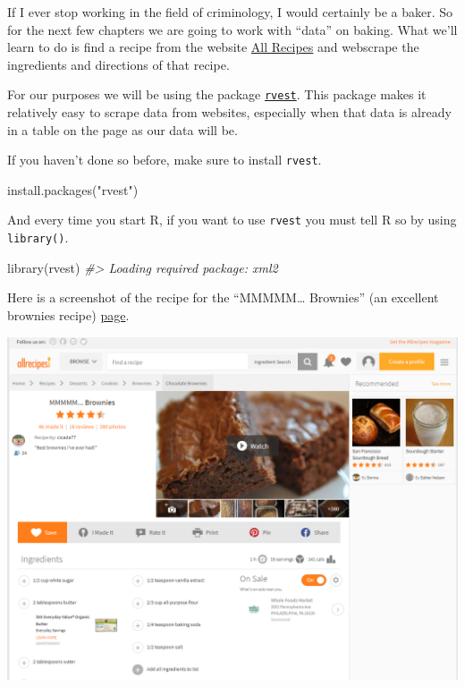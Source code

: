 \documentclass[
  12pt,
]{book}
\newenvironment{Shaded}{\begin{snugshade}}{\end{snugshade}}
\newcommand{\CommentTok}[1]{\textcolor[rgb]{0.37,0.37,0.37}{\textit{#1}}}
\newcommand{\FunctionTok}[1]{\textcolor[rgb]{0,0,0}{#1}}
\newcommand{\NormalTok}[1]{#1}
\newcommand{\StringTok}[1]{\textcolor[rgb]{0.5,0.5,0.5}{#1}}
\begin{document}
If I ever stop working in the field of criminology, I would certainly be a baker. So for the next few chapters we are going to work with ``data'' on baking. What we'll learn to do is find a recipe from the website \href{https://www.allrecipes.com/}{All Recipes} and webscrape the ingredients and directions of that recipe.

For our purposes we will be using the package \href{https://github.com/tidyverse/rvest}{\texttt{rvest}}. This package makes it relatively easy to scrape data from websites, especially when that data is already in a table on the page as our data will be.

If you haven't done so before, make sure to install \texttt{rvest}.

\begin{Shaded}
\begin{Highlighting}[]
\FunctionTok{install.packages}\NormalTok{(}\StringTok{"rvest"}\NormalTok{)}
\end{Highlighting}
\end{Shaded}

And every time you start R, if you want to use \texttt{rvest} you must tell R so by using \texttt{library()}.

\begin{Shaded}
\begin{Highlighting}[]
\FunctionTok{library}\NormalTok{(rvest)}
\CommentTok{\#\textgreater{} Loading required package: xml2}
\end{Highlighting}
\end{Shaded}

Here is a screenshot of the recipe for the ``MMMMM\ldots{} Brownies'' (an excellent brownies recipe) \href{https://www.allrecipes.com/recipe/25080/mmmmm-brownies/?internalSource=hub\%20recipe\&referringContentType=Search}{page}.

\includegraphics{images/brownies_1.PNG}
\end{document}
